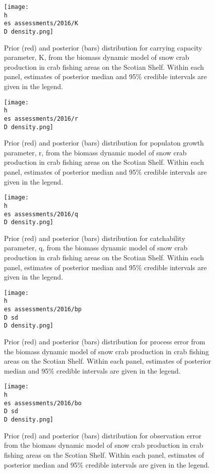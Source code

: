 \documentclass[11pt]{article}
\newcommand{\D}{.}
\newcommand{\h}{\string~/}
\newcommand{\es}{bio.data/bio.snowcrab/}
\begin{document}
\begin{figure}
    
    \texttt{[image: \\h \\es assessments/2016/K\\D density.png]}
    \caption{Prior (red) and posterior (bars) distribution for carrying capacity parameter, K, from the biomass dynamic model of snow crab production in crab fishing areas on the Scotian Shelf. Within each panel, estimates of posterior median and 95\% credible intervals are given in the legend.}
  
\end{figure}
\clearpage

\begin{figure}
    
    \texttt{[image: \\h \\es assessments/2016/r\\D density.png]}
    \caption{Prior (red) and posterior (bars) distribution for populaton growth parameter, r, from the biomass dynamic model of snow crab production in crab fishing areas on the Scotian Shelf. Within each panel, estimates of posterior median and 95\% credible intervals are given in the legend.}
  
\end{figure}
\clearpage

\begin{figure}
    
    \texttt{[image: \\h \\es assessments/2016/q\\D density.png]}
    \caption{Prior (red) and posterior (bars) distribution for catchability parameter, q, from the biomass dynamic model of snow crab production in crab fishing areas on the Scotian Shelf. Within each panel, estimates of posterior median and 95\% credible intervals are given in the legend.}
  
\end{figure}
\clearpage



\begin{figure}
    
    \texttt{[image: \\h \\es assessments/2016/bp\\D sd\\D density.png]}
    \caption{Prior (red) and posterior (bars) distribution for process error from the biomass dynamic model of snow crab production in crab fishing areas on the Scotian Shelf. Within each panel, estimates of posterior median and 95\% credible intervals are given in the legend.}
  
\end{figure}
\clearpage

\begin{figure}
    
    \texttt{[image: \\h \\es assessments/2016/bo\\D sd\\D density.png]}
    \caption{Prior (red) and posterior (bars) distribution for observation error from the biomass dynamic model of snow crab production in crab fishing areas on the Scotian Shelf. Within each panel, estimates of posterior median and 95\% credible intervals are given in the legend.}
  
\end{figure}
\clearpage
\end{document}
